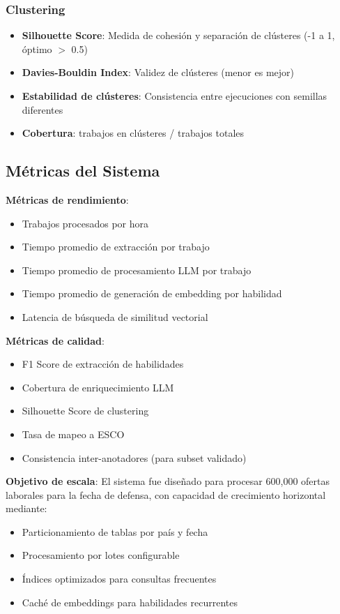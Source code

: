 \subsubsection{Clustering}
\begin{itemize}
    \item \textbf{Silhouette Score}: Medida de cohesión y separación de clústeres (-1 a 1, óptimo $>$ 0.5)
    \item \textbf{Davies-Bouldin Index}: Validez de clústeres (menor es mejor)
    \item \textbf{Estabilidad de clústeres}: Consistencia entre ejecuciones con semillas diferentes
    \item \textbf{Cobertura}: trabajos en clústeres / trabajos totales
\end{itemize}

\subsection{Métricas del Sistema}

\textbf{Métricas de rendimiento}:
\begin{itemize}
    \item Trabajos procesados por hora
    \item Tiempo promedio de extracción por trabajo
    \item Tiempo promedio de procesamiento LLM por trabajo
    \item Tiempo promedio de generación de embedding por habilidad
    \item Latencia de búsqueda de similitud vectorial
\end{itemize}

\textbf{Métricas de calidad}:
\begin{itemize}
    \item F1 Score de extracción de habilidades
    \item Cobertura de enriquecimiento LLM
    \item Silhouette Score de clustering
    \item Tasa de mapeo a ESCO
    \item Consistencia inter-anotadores (para subset validado)
\end{itemize}

\textbf{Objetivo de escala}: El sistema fue diseñado para procesar 600,000 ofertas laborales para la fecha de defensa, con capacidad de crecimiento horizontal mediante:
\begin{itemize}
    \item Particionamiento de tablas por país y fecha
    \item Procesamiento por lotes configurable
    \item Índices optimizados para consultas frecuentes
    \item Caché de embeddings para habilidades recurrentes
\end{itemize}
